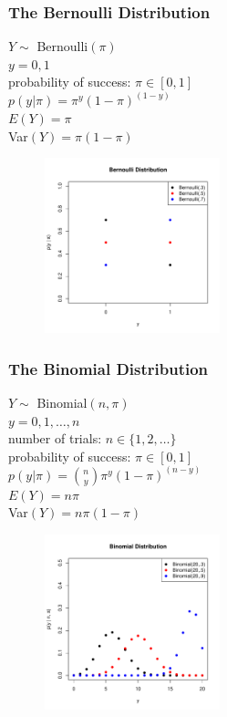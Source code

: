 \documentclass{beamer}
\begin{document}
\begin{frame}
\frametitle{The Bernoulli Distribution}
\begin{multicols}{2}
\pause
$Y \sim$ Bernoulli$(\pi)$\\
\bigskip
\pause
$y = 0,1$\\
\bigskip
\pause
probability of success: $\pi \in [0,1]$\\
\bigskip
\pause
$p(y|\pi) = \pi^y (1 - \pi)^{(1-y)}$\\
\bigskip
\bigskip
\pause
$E(Y) = \pi$\\
\bigskip
\pause
Var$(Y) = \pi (1 - \pi)$
\pause


\begin{figure}[!htp]
\begin{center}
\includegraphics[width=2in, height=2in]{probability-bernoulli.pdf}
\end{center}
\end{figure}
\end{multicols}
\end{frame}



\begin{frame}
\frametitle{The Binomial Distribution}
\begin{multicols}{2}
\pause
$Y \sim$ Binomial$(n, \pi)$\\
\bigskip
\pause
$y = 0,1,\dots,n$\\
\bigskip
\pause
number of trials: $n \in \{1,2,\dots \}$\\
\pause
probability of success: $\pi \in [0,1]$\\
\bigskip
\pause
$p(y|\pi) = \binom{n}{y} \pi^y (1 - \pi)^{(n-y)}$\\
\bigskip
\bigskip
\pause
$E(Y) = n \pi$\\
\bigskip
\pause
Var$(Y) = n \pi (1 - \pi)$
\pause


\begin{figure}[!htp]
\begin{center}
\includegraphics[width=2in, height=2in]{probability-binomial.pdf}
\end{center}
\end{figure}
\end{multicols}
\end{frame}
\end{document}
